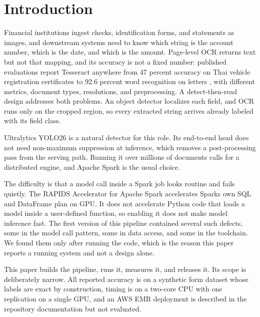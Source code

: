 \section{Introduction}
Financial institutions ingest checks, identification forms, and statements as images, and downstream systems need to know which string is the account number, which is the date, and which is the amount. Page-level OCR returns text but not that mapping, and its accuracy is not a fixed number: published evaluations report Tesseract anywhere from 47 percent accuracy on Thai vehicle registration certificates \cite{thammarak2022} to 92.6 percent word recognition on letters \cite{reisswig2019}, with different metrics, document types, resolutions, and preprocessing. A detect-then-read design addresses both problems. An object detector localizes each field, and OCR runs only on the cropped region, so every extracted string arrives already labeled with its field class.

Ultralytics YOLO26 \cite{jocher2026yolo26} is a natural detector for this role. Its end-to-end head does not need non-maximum suppression at inference, which removes a post-processing pass from the serving path. Running it over millions of documents calls for a distributed engine, and Apache Spark \cite{zaharia2012} is the usual choice.

The difficulty is that a model call inside a Spark job looks routine and fails quietly. The RAPIDS Accelerator for Apache Spark \cite{nvidia_udf,nvidia_rapids} accelerates Spark\textquotesingle{}s own SQL and DataFrame plan on GPU. It does not accelerate Python code that loads a model inside a user-defined function, so enabling it does not make model inference fast. The first version of this pipeline contained several such defects, some in the model call pattern, some in data access, and some in the toolchain. We found them only after running the code, which is the reason this paper reports a running system and not a design alone.

This paper builds the pipeline, runs it, measures it, and releases it. Its scope is deliberately narrow. All reported accuracy is on a synthetic form dataset whose labels are exact by construction, timing is on a two-core CPU with one replication on a single GPU, and an AWS EMR deployment is described in the repository documentation but not evaluated.

